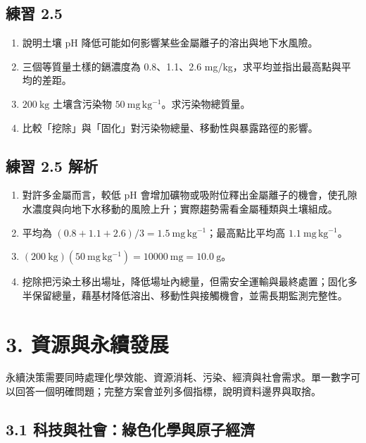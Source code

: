 \documentclass[11pt,a4paper]{article}
\providecommand{\tightlist}{%
  \setlength{\itemsep}{0pt}\setlength{\parskip}{0pt}}
\begin{document}
\subsection{練習 2.5}\label{ux7df4ux7fd2-2.5}

\begin{enumerate}
\def\labelenumi{\arabic{enumi}.}
\tightlist
\item
  說明土壤 pH 降低可能如何影響某些金屬離子的溶出與地下水風險。
\item
  三個等質量土樣的鎘濃度為 0.8、1.1、2.6 mg/kg，求平均並指出最高點與平均的差距。
\item
  \(200\ \mathrm{kg}\) 土壤含污染物 \(50\ \mathrm{mg\,kg^{-1}}\)。求污染物總質量。
\item
  比較「挖除」與「固化」對污染物總量、移動性與暴露路徑的影響。
\end{enumerate}

\subsection{練習 2.5 解析}\label{ux7df4ux7fd2-2.5-ux89e3ux6790}

\begin{enumerate}
\def\labelenumi{\arabic{enumi}.}
\tightlist
\item
  對許多金屬而言，較低 pH 會增加礦物或吸附位釋出金屬離子的機會，使孔隙水濃度與向地下水移動的風險上升；實際趨勢需看金屬種類與土壤組成。
\item
  平均為 \((0.8+1.1+2.6)/3=1.5\ \mathrm{mg\,kg^{-1}}\)；最高點比平均高 \(1.1\ \mathrm{mg\,kg^{-1}}\)。
\item
  \((200\ \mathrm{kg})(50\ \mathrm{mg\,kg^{-1}})=10000\ \mathrm{mg}=10.0\ \mathrm g\)。
\item
  挖除把污染土移出場址，降低場址內總量，但需安全運輸與最終處置；固化多半保留總量，藉基材降低溶出、移動性與接觸機會，並需長期監測完整性。
\end{enumerate}

\section{3. 資源與永續發展}\label{ux8cc7ux6e90ux8207ux6c38ux7e8cux767cux5c55}

永續決策需要同時處理化學效能、資源消耗、污染、經濟與社會需求。單一數字可以回答一個明確問題；完整方案會並列多個指標，說明資料邊界與取捨。

\subsection{3.1 科技與社會：綠色化學與原子經濟}\label{ux79d1ux6280ux8207ux793eux6703ux7da0ux8272ux5316ux5b78ux8207ux539fux5b50ux7d93ux6fdf}
\end{document}
